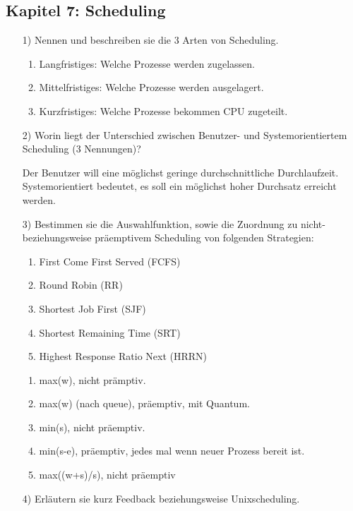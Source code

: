 \documentclass[11pt,a4paper]{article}
\begin{document}
\subsection*{Kapitel 7: Scheduling}
\begin{itemize}
\item[1)] Nennen und beschreiben sie die 3 Arten von Scheduling.

\begin{enumerate}
\item Langfristiges: Welche Prozesse werden zugelassen.
\item Mittelfristiges: Welche Prozesse werden ausgelagert.
\item Kurzfristiges: Welche Prozesse bekommen CPU zugeteilt.
\end{enumerate}

\item[2)] Worin liegt der Unterschied zwischen Benutzer- und Systemorientiertem Scheduling (3 Nennungen)?

Der Benutzer will eine möglichst geringe durchschnittliche Durchlaufzeit. Systemorientiert bedeutet, es soll ein möglichst hoher Durchsatz erreicht werden.


\item[3)] Bestimmen sie die Auswahlfunktion, sowie die Zuordnung zu nicht- beziehungsweise präemptivem Scheduling von folgenden Strategien:
\begin{enumerate}
\item First Come First Served (FCFS)
\item Round Robin (RR)
\item Shortest Job First (SJF)
\item Shortest Remaining Time (SRT)
\item Highest Response Ratio Next (HRRN)
\end{enumerate}

\begin{enumerate}
\item max(w), nicht prämptiv.
\item max(w) (nach queue), präemptiv, mit Quantum.
\item min(s), nicht präemptiv.
\item min(s-e), präemptiv, jedes mal wenn neuer Prozess bereit ist.
\item max((w+s)/s), nicht präemptiv
\end{enumerate}

\item[4)] Erläutern sie kurz Feedback beziehungsweise Unixscheduling.


\end{itemize}
\end{document}
